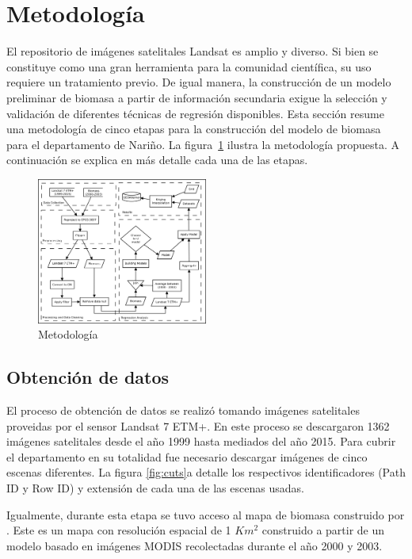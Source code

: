 
\section{Metodología}
El repositorio de imágenes satelitales Landsat es amplio y diverso.  Si bien se constituye como una gran herramienta para la comunidad científica, su uso requiere un tratamiento previo.  De igual manera, la construcción de un modelo preliminar de biomasa a partir de información secundaria exigue la selección y validación de diferentes técnicas de regresión disponibles.  Esta sección resume una metodología de cinco etapas para la construcción del modelo de biomasa para el departamento de Nariño.  La figura~\ref{fig:metodology} ilustra la metodología propuesta. A continuación se explica en más detalle cada una de las etapas.

\begin{figure}
  \centering
  \includegraphics[width = 0.5\textwidth]{metodology.png}
  \caption{Metodología}
  \label{fig:metodology}
\end{figure}

\subsection{Obtención de datos}

El proceso de obtención de datos se realizó tomando imágenes satelitales proveidas por el sensor Landsat 7 ETM+. En este proceso se descargaron 1362 imágenes satelitales desde el año 1999 hasta mediados del año 2015. Para cubrir el departamento en su totalidad fue necesario descargar imágenes de cinco escenas diferentes.  La figura \ref{fig:cuts}a detalle los respectivos identificadores (Path ID y Row ID) y extensión de cada una de las escenas usadas.

Igualmente, durante esta etapa se tuvo acceso al mapa de biomasa construido por \cite{baccini2008afirst}.  Este es un mapa con resolución espacial de 1 $Km^2$ construido a partir de un modelo basado en imágenes MODIS recolectadas durante el año 2000 y 2003.


